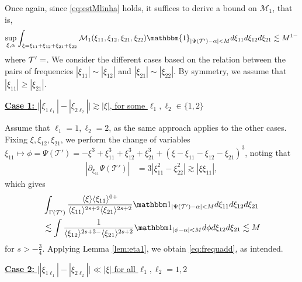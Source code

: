\documentclass[a4paper,
11pt,  reqno]{amsart}
\makeatletter
\newcommand{\5}{\textup{V}}
\newcommand{\noi}{\noindent}
\newcommand{\ind}{\mathbbm 1}
\newcommand{\les}{\lesssim}
\theoremstyle{remark}
\newcommand{\TT}{\mathcal{T}}
\newcommand{\al}{\alpha}
\newcommand{\G}{\Gamma}
\renewcommand{\l}{\ell}
\newcommand{\ges}{\gtrsim}
\newcommand{\jb}[1]
{\langle #1 \rangle}
\newcommand{\M}{\mathcal{M}}
\def\<#1>{\csname MH@symb@#1\endcsname}
\numberwithin{equation}{section}
\numberwithin{theorem}{section}
\makeatother
\begin{document}
Once again, since \eqref{eq:estMlinha} holds, it suffices to derive a bound on $\M_1$, that is,
\begin{align}\label{eq:frequadd}
    \sup_{\xi, \al} 
\int_{\xi=\xi_{11} + \xi_{12} + \xi_{21} + \xi_{22}} \mathcal{M}_1(\xi_{11}, \xi_{12}, \xi_{21}, \xi_{22}) \mathbbm{1}_{|\Psi(\TT')-\alpha|<M}d\xi_{11}d\xi_{12}d\xi_{21}
\les M^{1-}
\end{align}
where $\TT'=\<33>$.
We consider the different cases based on the relation between the pairs of frequencies $|\xi_{11}|\sim |\xi_{12}|$ and $|\xi_{21}| \sim |\xi_{22}|$. By symmetry, we assume that $|\xi_{11}| \ge|\xi_{21}|$.

\smallskip
\noi
\underline{\textbf{Case 1:} $\big||\xi_{1 \l_1}|-|\xi_{2\l_2}|\big| \ges |\xi|$, for some $\l_1,\l_2\in\{1,2\}$}

Assume that $\l_1 = 1,\l_2=2$, as the same approach applies to the other cases. 
Fixing $\xi, \xi_{12},\xi_{21}$, we perform the change of variables 
$
\xi_{11} \mapsto \phi = \Psi(\TT') 
= - \xi^3 +  \xi_{11}^3 +  \xi_{12}^3 +  \xi_{21}^3 +  (\xi-\xi_{11}-\xi_{12}-\xi_{21})^3$,
noting that
\begin{align}\label{CV1}
|\partial_{\xi_{11}} \Psi(\TT') |
& = 3|\xi_{11}^2-\xi_{22}^2| \gtrsim |\xi \xi_{11}|,
\end{align}
which gives
\begin{align}
& 
\int_{\G(\TT')}
\frac{\jb{\xi} \jb{\xi_{11}}^{0+}  }{\jb{\xi_{11}}^{2s+2} \jb{\xi_{21}}^{2s+2} } \ind_{| \Psi(\TT') - \al | < M } d\xi_{11} d\xi_{12} d\xi_{21}
\\
&
\les \int \frac{1}{\jb{\xi_{12}}^{2s+3-} \jb{\xi_{21}}^{2s+2}} \ind_{| \phi - \al  | < M } d\phi d\xi_{12} d\xi_{21} 
\les M 
\end{align}
for $s>-\frac34$. Applying Lemma \ref{lem:eta1}, we obtain  \eqref{eq:frequadd}, as intended.




\smallskip
\noi
\underline{\textbf{Case 2:} $ \big| |\xi_{1\l_1}| - |\xi_{2\l_2}| \big|\ll |\xi| $ for all $\l_1,\l_2=1,2$}
\end{document}
